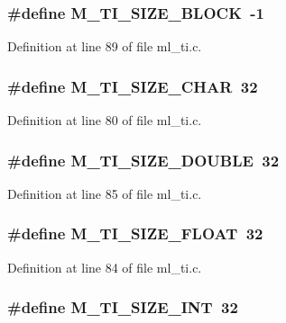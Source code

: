 \subsubsection{\setlength{\rightskip}{0pt plus 5cm}\#define M\_\-TI\_\-SIZE\_\-BLOCK~-1}\label{ml__ti_8c_2cc906f967840afae284c45a636f60fe}




Definition at line 89 of file ml\_\-ti.c.
\subsubsection{\setlength{\rightskip}{0pt plus 5cm}\#define M\_\-TI\_\-SIZE\_\-CHAR~32}\label{ml__ti_8c_603e55daa81040df099857c075ef5f05}




Definition at line 80 of file ml\_\-ti.c.
\subsubsection{\setlength{\rightskip}{0pt plus 5cm}\#define M\_\-TI\_\-SIZE\_\-DOUBLE~32}\label{ml__ti_8c_b26027711a8ac5d3f24f8a04589c5a18}




Definition at line 85 of file ml\_\-ti.c.
\subsubsection{\setlength{\rightskip}{0pt plus 5cm}\#define M\_\-TI\_\-SIZE\_\-FLOAT~32}\label{ml__ti_8c_9c79d3d8ff2d83e401cafc66f77fb90c}




Definition at line 84 of file ml\_\-ti.c.
\subsubsection{\setlength{\rightskip}{0pt plus 5cm}\#define M\_\-TI\_\-SIZE\_\-INT~32}\label{ml__ti_8c_3b1e0f3b322e6256389055a6496e8f33}





